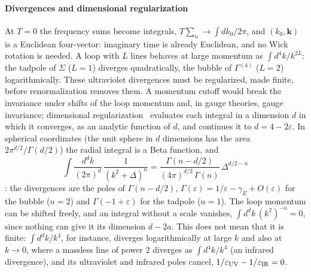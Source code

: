 \documentclass[11pt,a4paper]{article}
\begin{document}
\paragraph{Divergences and dimensional regularization} At $T=0$ the frequency sums become integrals,
$T\sum_n\to\int dk_0/2\pi$, and $(k_0,\mathbf k)$ is a Euclidean four-vector: imaginary time is already Euclidean, and no
Wick rotation is needed. A loop with $L$ lines behaves at large momentum as $\int d^4k/k^{2L}$: the tadpole of $\Sigma$
($L=1$) diverges quadratically, the bubble of $\Gamma^{(4)}$ ($L=2$) logarithmically. These ultraviolet divergences must
be regularized, made finite, before renormalization removes them. A momentum cutoff would break the invariance under
shifts of the loop momentum and, in gauge theories, gauge invariance; dimensional
regularization~\cite{tHooftVeltman1972,BolliniGiambiagi1972,Collins1984} evaluates each integral in a dimension $d$ in which
it converges, as an analytic function of $d$, and continues it to $d=4-2\varepsilon$. In spherical coordinates (the unit
sphere in $d$ dimensions has the area $2\pi^{d/2}/\Gamma(d/2)$) the radial integral is a Beta function, and
\[
\int\frac{d^dk}{(2\pi)^d}\,\frac1{(k^2+\Delta)^n}=\frac{\Gamma(n-d/2)}{(4\pi)^{d/2}\,\Gamma(n)}\,\Delta^{d/2-n}
\]
\cite[section~7.5 and appendix~A.4]{PeskinSchroeder}: the divergences are the poles of $\Gamma(n-d/2)$,
$\Gamma(\varepsilon)=1/\varepsilon-\gamma_E+O(\varepsilon)$ for the bubble ($n=2$) and $\Gamma(-1+\varepsilon)$ for the
tadpole ($n=1$). The loop momentum can be shifted freely, and an integral without a scale vanishes,
$\int d^dk\,(k^2)^{-a}=0$, since nothing can give it its dimension $d-2a$. This does not mean that it is finite:
$\int d^dk/k^4$, for instance, diverges logarithmically at large $k$ and also at $k\to0$, where a massless line of power 2
diverges as $\int d^4k/k^4$ (an infrared divergence), and its ultraviolet and infrared poles cancel,
$1/\varepsilon_{\rm UV}-1/\varepsilon_{\rm IR}=0$.
\end{document}

